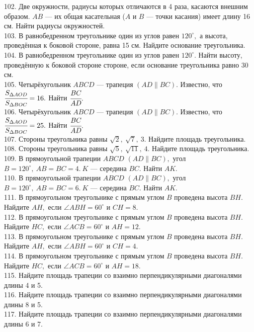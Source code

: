 \documentclass[12pt]{article}
\begin{document}
102. Две окружности, радиусы которых отличаются в 4 раза, касаются внешним образом. $AB$ --- их общая касательная ($A$ и $B$ --- точки касания) имеет длину 16 см. Найти радиусы окружностей.\\
103. В равнобедренном треугольнике один из углов равен $120^\circ,$ а высота, проведённая к боковой стороне, равна 15 см. Найдите основание треугольника.\\
104. В равнобедренном треугольнике один из углов равен $120^\circ.$ Найти высоту, проведённую к боковой стороне стороне, если основание треугольника равно 30 см.\\
105. Четырёхугольник $ABCD$ --- трапеция $(AD\parallel BC).$ Известно, что $\cfrac{S_{\Delta AOD}}{S_{\Delta BOC}}=16.$ Найти $\cfrac{BC}{AD}.$\\
106. Четырёхугольник $ABCD$ --- трапеция $(AD\parallel BC).$ Известно, что $\cfrac{S_{\Delta AOD}}{S_{\Delta BOC}}=25.$ Найти $\cfrac{BC}{AD}.$\\
107. Стороны треугольника равны $\sqrt{2},\ \sqrt{7},\ 3.$ Найдите площадь треугольника.\\
108. Стороны треугольника равны $\sqrt{5},\ \sqrt{11},\ 4.$ Найдите площадь треугольника.\\
109. В прямоугольной трапеции $ABCD$ $(AD\parallel BC),$ угол $B=120^\circ,\ AB=BC=4.\ K$ --- середина $BC.$ Найти $AK.$\\
110. В прямоугольной трапеции $ABCD$ $(AD\parallel BC),$ угол $B=120^\circ,\ AB=BC=6.\ K$ --- середина $BC.$ Найти $AK.$\\
111. В прямоугольном треугольнике с прямым углом $B$ проведена высота $BH.$ Найдите $AH,$ если $\angle ABH=60^\circ$ и $CH=8.$\\
112. В прямоугольном треугольнике с прямым углом $B$ проведена высота $BH.$ Найдите $HC,$ если $\angle ACB=60^\circ$ и $AH=12.$\\
113. В прямоугольном треугольнике с прямым углом $B$ проведена высота $BH.$ Найдите $AH,$ если $\angle ABH=60^\circ$ и $CH=4.$\\
114. В прямоугольном треугольнике с прямым углом $B$ проведена высота $BH.$ Найдите $HC,$ если $\angle ACB=60^\circ$ и $AH=18.$\\
115. Найдите площадь трапеции со взаимно перпендикулярными диагоналями длины 4 и 5.\\
116. Найдите площадь трапеции со взаимно перпендикулярными диагоналями длины 8 и 5.\\
117. Найдите площадь трапеции со взаимно перпендикулярными диагоналями длины 6 и 7.\\
\end{document}
